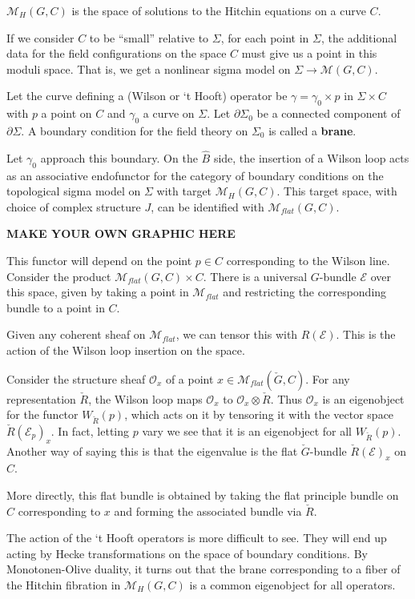 	\begin{defn}
		$\mathcal M_H (G, C)$ is the space of solutions to the Hitchin equations on a curve $C$. 
	\end{defn}
	If we consider $C$ to be ``small'' relative to $\Sigma$, for each point in $\Sigma$, the additional data for the field configurations on the space $C$ must give us a point in this moduli space. That is, we get a nonlinear sigma model on $\Sigma \to \mathcal M (G, C)$.
	
	Let the curve defining a (Wilson or `t Hooft) operator be $\gamma = \gamma_0 \times p$ in $\Sigma \times C$ with $p$ a point on $C$ and $\gamma_0$ a curve on $\Sigma$. Let $\partial \Sigma_0$ be a connected component of $\partial \Sigma$. A boundary condition for the field theory on $\Sigma_0$ is called a \textbf{brane}.
	
	Let $\gamma_0$ approach this boundary. On the $\hat B$ side, the insertion of a Wilson loop acts as an associative endofunctor for the category of boundary conditions on the topological sigma model on $\Sigma$ with target $\mathcal M_H (G, C)$. This target  space, with choice of complex structure $J$, can be identified with $\mathcal M_{flat} (G, C)$.
	
	\begin{center}
		\textbf{MAKE YOUR OWN GRAPHIC HERE}
	\end{center}
	
	 This functor will depend on the point $p \in C$ corresponding to the Wilson line. Consider the product $\mathcal M_{flat} (G, C) \times C$. There is a universal $G$-bundle $\mathcal E$ over this space, given by taking a point in $\mathcal M_{flat}$ and restricting the corresponding bundle to a point in $C$. 
	
	Given any coherent sheaf on $\mathcal M_{flat}$, we can tensor this with $R(\mathcal E)$. This is the action of the Wilson loop insertion on the space.
	
	Consider the structure sheaf $\mathcal O_x$ of a point $x \in \mathcal M_{flat}(\check G, C)$. For any representation $\check R$, the Wilson loop maps $\mathcal O_x$ to $\mathcal O_x \otimes \check{R}$.
	Thus $\mathcal O_x$ is an eigenobject for the functor $W_{\check R}(p)$, which acts on it by tensoring it with the vector space $\check R(\mathcal E_p)_x$. In fact, letting $p$ vary we see that it is an eigenobject for all $W_{\check R}(p)$. Another way of saying this is that the eigenvalue is the flat $\check G$-bundle $\check R(\mathcal E)_x$ on $C$.
	
	More directly, this flat bundle is obtained by taking the flat principle bundle on $C$ corresponding to $x$ and forming the associated bundle via $\check R$.
	
	The action of the `t Hooft operators is more difficult to see. They will end up acting by Hecke transformations on the space of boundary conditions. By Monotonen-Olive duality, it turns out that the brane corresponding to a fiber of the Hitchin fibration in $\mathcal M_H(G, C)$ is a common eigenobject for all operators.
	

